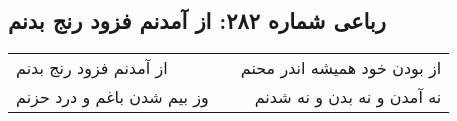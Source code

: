 \begin{center}
\section*{رباعی شماره ۲۸۲: از آمدنم فزود رنج بدنم}
\label{sec:sh282}
\begin{longtable}{l p{0.5cm} r}
از آمدنم فزود رنج بدنم
&&
از بودن خود همیشه اندر محنم
\\
وز بیم شدن باغم و درد حزنم
&&
نه آمدن و نه بدن و نه شدنم
\\
\end{longtable}
\end{center}

